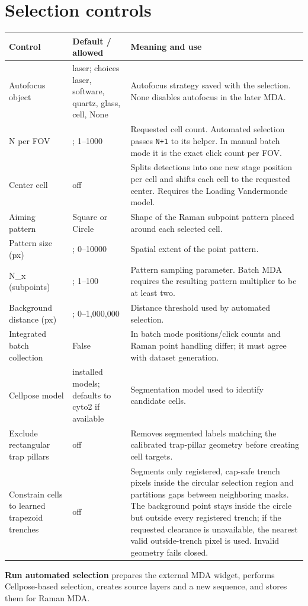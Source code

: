 \documentclass[11pt,oneside]{report}
\makeatletter
\newcommand{\ui}[1]{\textbf{#1}}
\newcommand{\code}[1]{\texttt{#1}}
\newcommand{\fieldtable}{\begin{longtable}{@{}>{\raggedright\arraybackslash}p{0.25\textwidth}>{\raggedright\arraybackslash}p{0.18\textwidth}>{\raggedright\arraybackslash}p{0.50\textwidth}@{}}\toprule\textbf{Control} & \textbf{Default / allowed} & \textbf{Meaning and use}\\\midrule\endhead}
\newcommand{\finishfieldtable}{\bottomrule\end{longtable}}
\makeatother
\begin{document}
\section{Selection controls}
\fieldtable
Autofocus object & laser; choices laser, software, quartz, glass, cell, None &
Autofocus strategy saved with the selection. None disables autofocus in the later MDA.\\
N per FOV & 6; 1--1000 & Requested cell count. Automated selection passes
\code{N+1} to its helper. In manual batch mode it is the exact click count per FOV.\\
Center cell & off & Splits detections into one new stage position per cell and shifts
each cell to the requested center. Requires the Loading Vandermonde model.\\
Aiming pattern & Square or Circle & Shape of the Raman subpoint pattern placed around
each selected cell.\\
Pattern size (px) & 30; 0--10000 & Spatial extent of the point pattern.\\
N\_x (subpoints) & 1; 1--100 & Pattern sampling parameter. Batch MDA requires the
resulting pattern multiplier to be at least two.\\
Background distance (px) & 80; 0--1,000,000 & Distance threshold used by automated selection.\\
Integrated batch collection & False & In batch mode positions/click counts and Raman
point handling differ; it must agree with dataset generation.\\
Cellpose model & installed models; defaults to cyto2 if available & Segmentation model
used to identify candidate cells.\\
Exclude rectangular trap pillars & off & Removes segmented labels matching the
calibrated trap-pillar geometry before creating cell targets.\\
Constrain cells to learned trapezoid trenches & off & Segments only registered,
cap-safe trench pixels inside the circular selection region and partitions gaps
between neighboring masks. The background point stays inside the circle but
outside every registered trench; if the requested clearance is unavailable,
the nearest valid outside-trench pixel is used. Invalid geometry fails closed.\\
\finishfieldtable

\ui{Run automated selection} prepares the external MDA widget, performs Cellpose-based
selection, creates source layers and a new sequence, and stores them for Raman MDA.
\end{document}
